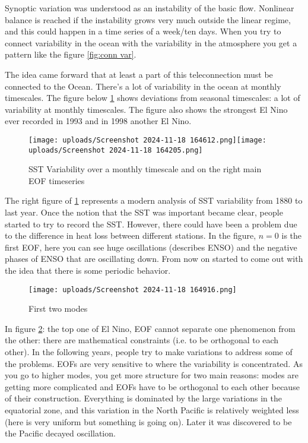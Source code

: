 Synoptic variation was understood as an instability of the basic flow. Nonlinear balance is reached if the instability grows very much outside the linear regime, and this could happen in a time series of a week/ten days.
When you try to connect variability in the ocean with the variability in the atmosphere you get a pattern like the figure \ref{fig:conn var}.






The idea came forward that at least a part of this teleconnection must be connected to the Ocean. There's a lot of variability in the ocean at monthly timescales. The figure below \ref{fig:SST VAR} shows deviations from seasonal timescales: a lot of variability at monthly timescales. The figure also shows the strongest El Nino ever recorded in 1993 and in 1998 another El Nino.
\begin{figure}[htpb]
	\centering
	\texttt{[image: uploads/Screenshot 2024-11-18 164612.png]}\quad \texttt{[image: uploads/Screenshot 2024-11-18 164205.png]}
	\caption{SST Variability over a monthly timescale and on the right main EOF timeseries}
	\label{fig:SST VAR}
\end{figure}



The right figure of \ref{fig:SST VAR} represents a modern analysis of SST variability from 1880 to last year. Once the notion that the SST was important became clear, people started to try to record the SST. However, there could have been a problem due to the difference in heat loss between different stations. In the figure, $n=0$ is the first EOF, here you can see huge oscillations (describes ENSO) and the negative phases of ENSO that are oscillating down. From now on started to come out with the idea that there is some periodic behavior.
\begin{figure}[htpb]
	\centering
	\texttt{[image: uploads/Screenshot 2024-11-18 164916.png]}
	\caption{First two modes}
	\label{fig:first two modes}
\end{figure}


In figure \ref{fig:first two modes}: the top one of El Nino, EOF cannot separate one phenomenon from the other: there are mathematical constraints (i.e. to be orthogonal to each other). In the following  years, people try to make variations to address some of the problems. EOFs are very sensitive to where the variability is concentrated. As you go to higher modes, you get more structure for two main reasons: modes are getting more complicated and EOFs have to be orthogonal to each other because of their construction. Everything is dominated by the large variations in the equatorial zone, and this variation in the North Pacific is relatively weighted less (here is very uniform but something is going on). Later it was discovered to be the Pacific decayed oscillation.

